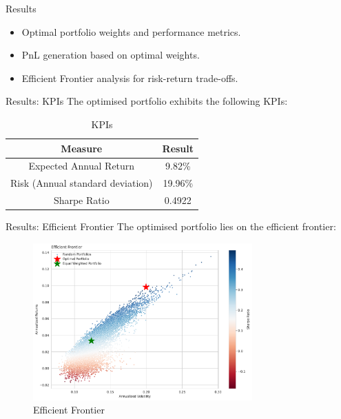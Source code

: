 \documentclass{beamer}
\begin{document}
\begin{frame}{Results}
  \begin{itemize}
    \item Optimal portfolio weights and performance metrics.
    \item PnL generation based on optimal weights.
    \item Efficient Frontier analysis for risk-return trade-offs.
  \end{itemize}
\end{frame}

\begin{frame}{Results: KPIs}
The optimised portfolio exhibits the following KPIs:
\begin{table}
    \centering
    \begin{tabular}{|c|c|}
        \hline
        \textbf{Measure} & \textbf{Result} \\ \hline %
        Expected Annual Return & 9.82\% \\ \hline %
        Risk (Annual standard deviation) & 19.96\% \\ \hline
        Sharpe Ratio & 0.4922 \\ \hline
    \end{tabular}
    \caption{KPIs}
    \label{table:tab1}
\end{table}
\end{frame}

\begin{frame}{Results: Efficient Frontier}
The optimised portfolio lies on the efficient frontier:
  \begin{figure}
    \centering
    \includegraphics[width=0.75\textwidth]{paper/figure/Optimal_PF.pdf}
    \caption{Efficient Frontier}
  \end{figure}
\end{frame}
\end{document}
